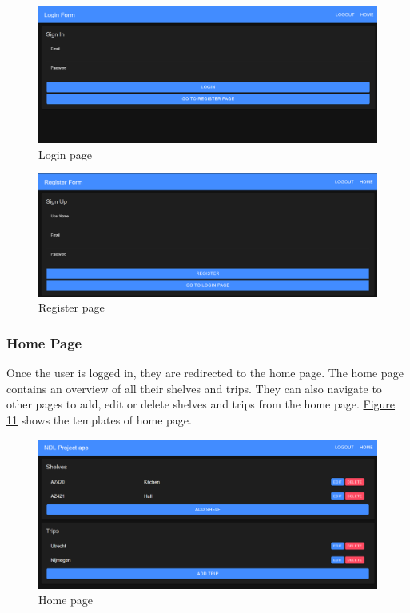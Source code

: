 \documentclass{article}
\begin{document}
\begin{figure}[H]
    \begin{center}
        \includegraphics[width=1\textwidth]{Front-End/Login.png}
    \end{center}
    \caption{Login page}
    \label{fig:login}
\end{figure}
\begin{figure}[H]
    \begin{center}
        \includegraphics[width=1\textwidth]{Front-End/Register.png}
    \end{center}
    \caption{Register page}
    \label{fig:register}
\end{figure}

\subsubsection{Home Page}
Once the user is logged in, they are redirected to the home page. The home page contains an overview of all their shelves and trips. They can also navigate to other pages to add, edit or delete shelves and trips from the home page. \hyperref[fig:home]{Figure 11} shows the templates of home page.

\begin{figure}[H]
    \begin{center}
        \includegraphics[width=1\textwidth]{Front-End/Main.png}
    \end{center}
    \caption{Home page}
    \label{fig:home}
\end{figure}
\end{document}
